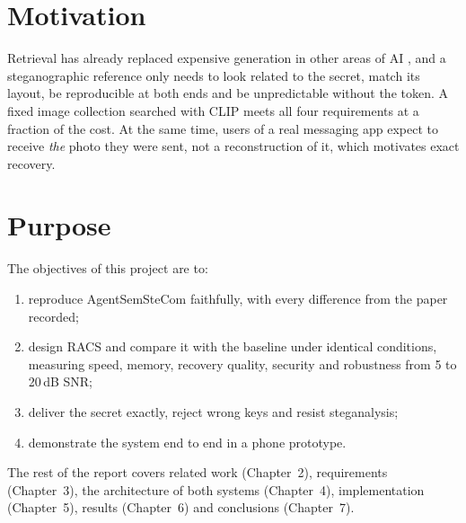 \section{Motivation}
Retrieval has already replaced expensive generation in other areas of AI
\cite{chen2022reimagen}, and a steganographic reference only needs to look related to the
secret, match its layout, be reproducible at both ends and be unpredictable without the token.
A fixed image collection searched with CLIP \cite{radford2021clip} meets all four requirements
at a fraction of the cost. At the same time, users of a real messaging app expect to receive
\emph{the} photo they were sent, not a reconstruction of it, which motivates exact recovery.

\section{Purpose}
The objectives of this project are to:
\begin{enumerate}
	\item reproduce AgentSemSteCom faithfully, with every difference from the paper recorded;
	\item design RACS and compare it with the baseline under identical conditions, measuring
	speed, memory, recovery quality, security and robustness from 5 to 20\,dB SNR;
	\item deliver the secret exactly, reject wrong keys and resist steganalysis;
	\item demonstrate the system end to end in a phone prototype.
\end{enumerate}

The rest of the report covers related work (Chapter~2), requirements (Chapter~3), the
architecture of both systems (Chapter~4), implementation (Chapter~5), results (Chapter~6) and
conclusions (Chapter~7).

